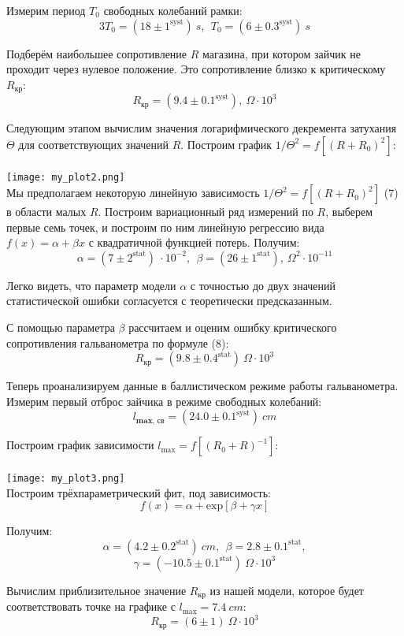 Измерим период $T_0$ свободных колебаний рамки:
$$ 3T_0 = (18 \pm 1^{\text{syst}})~s,~~T_0 = (6 \pm 0.3^{\text{syst}})~s$$

Подберём наибольшее сопротивление $R$ магазина, при котором зайчик не проходит через нулевое положение. Это сопротивление близко к критическому $R_{\text{кр}}$:
$$ R_{\text{кр}} = (9.4 \pm 0.1^{\text{syst}}),~\Omega \cdot 10^{3}$$

Следующим этапом вычислим значения логарифмического декремента затухания $\Theta$ для соответствующих значений $R$. Построим график $1/{\Theta^2} = f[(R + R_0)^2]$:\\
\\
\texttt{[image: my\_plot2.png]}\\

Мы предполагаем некоторую линейную зависимость $1/{\Theta^2} = f[(R + R_0)^2]$ (7) в области малых $R$. Построим вариационный ряд измерений по $R$, выберем первые семь точек, и построим по ним линейную регрессию вида $f(x) = \alpha + \beta x$ с квадратичной функцией потерь. Получим:
$$ \alpha = (7 \pm 2^{\text{stat}})~\cdot 10^{-2} ,~~\beta = (26 \pm 1^{\text{stat}}),~\Omega^2 \cdot 10^{-11}$$

Легко видеть, что параметр модели $\alpha$ с точностью до двух значений статистической ошибки согласуется с теоретически предсказанным.

С помощью параметра $\beta$ рассчитаем и оценим ошибку критического сопротивления гальванометра по формуле (8):
$$ R_{\text{кр}} = (9.8 \pm 0.4^{\text{stat}})~\Omega \cdot 10^{3}$$

Теперь проанализируем данные в баллистическом режиме работы гальванометра. Измерим первый отброс зайчика в режиме свободных колебаний:
$$l_{\textbf{max,~св}} = (24.0 \pm 0.1^{\text{syst}})~cm$$

Построим график зависимости $l_{\text{max}} = f[(R_0 + R)^{-1}]$:\\
\\
\texttt{[image: my\_plot3.png]}\\

Построим трёхпараметрический фит, под зависимость:
$$ f(x) = \alpha + \text{exp}\left[ \beta + \gamma x \right]$$

Получим:
$$\alpha = (4.2\pm 0.2^{\text{stat}})~cm,~~\beta = 2.8 \pm 0.1^{\text{stat}},$$
$$\gamma = (-10.5\pm 0.1^{\text{stat}})~\Omega \cdot 10^{3}$$

Вычислим приблизительное значение $R_{\text{кр}}$ из нашей модели, которое будет соответствовать точке на графике с $l_{\text{max}} = 7.4~cm$:
$$R_{\text{кр}} = (6 \pm 1)~\Omega \cdot 10^{3}$$

